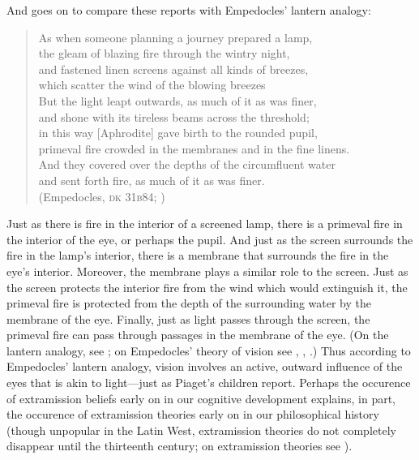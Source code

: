 And \citet[48--49]{Piaget:1929dp} goes on to compare these reports with Empedocles' lantern analogy:
\begin{verse}
	As when someone planning a journey prepared a lamp,\\
	the gleam of blazing fire through the wintry night,\\
	and fastened linen screens against all kinds of breezes,\\
	which scatter the wind of the blowing breezes\\
	But the light leapt outwards, as much of it as was finer,\\
	and shone with its tireless beams across the threshold;\\
	in this way [Aphrodite] gave birth to the rounded pupil,\\
	primeval fire crowded in the membranes and in the fine linens.\\
	And they covered over the depths of the circumfluent water\\
	and sent forth fire, as much of it as was finer.\\
	(Empedocles, \textsc{dk} 31\textsc{b}84; \citealt[103 259]{Inwood:2001ve})
\end{verse}
Just as there is fire in the interior of a screened lamp, there is a primeval fire in the interior of the eye, or perhaps the pupil. And just as the screen surrounds the fire in the lamp's interior, there is a membrane that surrounds the fire in the eye's interior. Moreover, the membrane plays a similar role to the screen. Just as the screen protects the interior fire from the wind which would extinguish it, the primeval fire is protected from the depth of the surrounding water by the membrane of the eye. Finally, just as light passes through the screen, the primeval fire can pass through passages in the membrane of the eye. (On the lantern analogy, see \citealt[240--243]{Wright:1981zr}; on Empedocles' theory of vision see \citealt{Sedley:1992uq}, \citealt{Ierodiakonou:2005fk}, \citealt[chapter 1]{Kalderon:2015fr}.) Thus according to Empedocles' lantern analogy, vision involves an active, outward influence of the eyes that is akin to light---just as Piaget's children report. Perhaps the occurence of extramission beliefs early on in our cognitive development explains, in part, the occurence of extramission theories early on in our philosophical history (though unpopular in the Latin West, extramission theories do not completely disappear until the thirteenth century; on extramission theories see \citealt[3--67]{Lindberg:1977aa}). 

